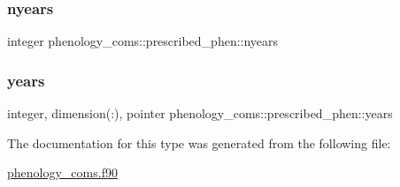 \subsubsection{\texorpdfstring{nyears}{nyears}}
{\footnotesize\ttfamily integer phenology\+\_\+coms\+::prescribed\+\_\+phen\+::nyears}

\mbox{\label{structphenology__coms_1_1prescribed__phen_ae40ae2762a61f5e09ce4162444b253b0}} 
\subsubsection{\texorpdfstring{years}{years}}
{\footnotesize\ttfamily integer, dimension(\+:), pointer phenology\+\_\+coms\+::prescribed\+\_\+phen\+::years}



The documentation for this type was generated from the following file\+:\begin{DoxyCompactItemize}
\item 
\hyperlink{phenology__coms_8f90}{phenology\+\_\+coms.\+f90}\end{DoxyCompactItemize}
